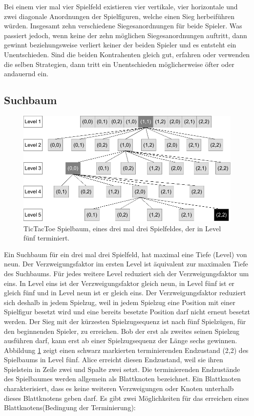 Bei einem vier mal vier Spielfeld existieren vier vertikale, vier horizontale und zwei diagonale Anordnungen der Spielfiguren, welche einen Sieg herbeiführen würden. Insgesamt zehn verschiedene Siegesanordnungen für beide Spieler. Was passiert jedoch, wenn keine der zehn möglichen Siegesanordnungen auftritt, dann gewinnt beziehungsweise verliert keiner der beiden Spieler und es entsteht ein Unentschieden. Sind die beiden Kontrahenten gleich gut, erfahren oder verwenden die selben Strategien, dann tritt ein Unentschieden möglicherweise öfter oder andauernd ein.

\subsection{Suchbaum}

\begin{figure}[!htbp]
  \centering
  \includegraphics[scale = 1]{inhalt/abbildungen/suchbaum_drei_mal_drei_tictactoe.pdf}
  \caption{TicTacToe Spielbaum, eines drei mal drei Spielfeldes, der in Level fünf terminiert.}
  \label{fig:drei_mal_drei_tictactoe_spielbaum}
\end{figure}

Ein Suchbaum für ein drei mal drei Spielfeld, hat maximal eine Tiefe (Level) von neun. Der Verzweigungsfaktor im ersten Level ist äquivalent zur maximalen Tiefe des Suchbaums. Für jedes weitere Level reduziert sich der Verzweigungsfaktor um eins. In Level eins ist der Verzweigungsfaktor gleich neun, in Level fünf ist er gleich fünf und in Level neun ist er gleich  eins. Der Verzweigungsfaktor reduziert sich deshalb in jedem Spielzug, weil in jedem Spielzug eine Position mit einer Spielfigur besetzt wird und eine bereits besetzte Position darf nicht erneut besetzt werden. Der Sieg mit der kürzesten Spielzugsequenz ist nach fünf Spielzügen, für den beginnenden Spieler, zu erreichen. Bob der erst als zweites seinen Spielzug ausführen darf, kann erst ab einer Spielzugsequenz der Länge sechs gewinnen. Abbildung \ref{fig:drei_mal_drei_tictactoe_spielbaum} zeigt einen schwarz markierten terminierenden Endzustand (2,2) des Spielbaums in Level fünf. Alice erreicht diesen Endzustand, weil sie ihren Spielstein in Zeile zwei und Spalte zwei setzt. Die terminierenden Endzustände des Spielbaumes werden allgemein als Blattknoten bezeichnet. Ein Blattknoten charakterisiert, dass es keine weiteren Verzweigungen oder Knoten unterhalb dieses Blattknotens geben darf.  Es gibt zwei Möglichkeiten für das erreichen eines Blattknotens(Bedingung der Terminierung):

